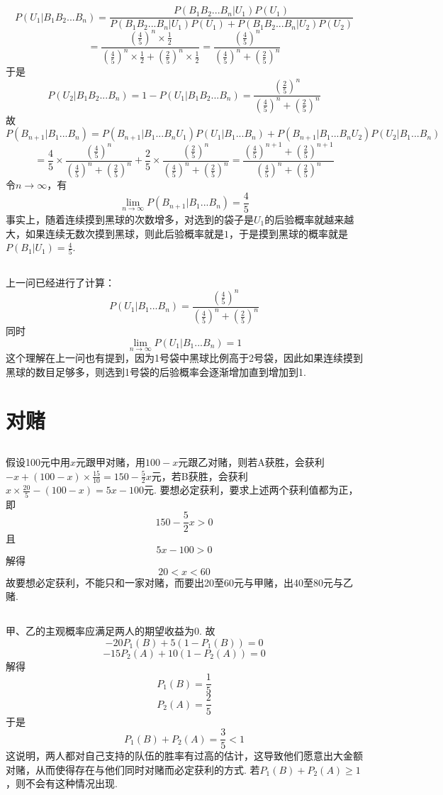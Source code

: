 \documentclass{article}
\begin{document}
\begin{CJK}{UTF8}{gbsn}
\subsection{}
$$P(U_{1}|B_{1}B_{2}...B_{n})=\frac{P(B_{1}B_{2}...B_{n}|U_{1})P(U_{1})}{P(B_{1}B_{2}...B_{n}|U_{1})P(U_{1})+P(B_{1}B_{2}...B_{n}|U_{2})P(U_{2})} $$
$$=\frac{(\frac{4}{5})^{n}\times \frac{1}{2}}{(\frac{4}{5})^{n}\times \frac{1}{2}+(\frac{2}{5})^{n}\times \frac{1}{2}}=\frac{(\frac{4}{5})^{n}}{(\frac{4}{5})^{n}+(\frac{2}{5})^{n}} $$
于是
$$P(U_{2}|B_{1}B_{2}...B_{n})=1-P(U_{1}|B_{1}B_{2}...B_{n})=\frac{(\frac{2}{5})^{n}}{(\frac{4}{5})^{n}+(\frac{2}{5})^{n}}$$
故
$$P(B_{n+1}|B_{1}...B_{n})=P(B_{n+1}|B_{1}...B_{n}U_{1})P(U_{1}|B_{1}...B_{n})+P(B_{n+1}|B_{1}...B_{n}U_{2})P(U_{2}|B_{1}...B_{n})$$
$$=\frac{4}{5}\times\frac{(\frac{4}{5})^{n}}{(\frac{4}{5})^{n}+(\frac{2}{5})^{n}}+\frac{2}{5}\times\frac{(\frac{2}{5})^{n}}{(\frac{4}{5})^{n}+(\frac{2}{5})^{n}}=\frac{(\frac{4}{5})^{n+1}+(\frac{2}{5})^{n+1}}{(\frac{4}{5})^{n}+(\frac{2}{5})^{n}}$$
令$n\to \infty$，有
$$\lim_{n\to \infty}P(B_{n+1}|B_{1}...B_{n})=\frac{4}{5}$$
事实上，随着连续摸到黑球的次数增多，对选到的袋子是$U_{1}$的后验概率就越来越大，如果连续无数次摸到黑球，则此后验概率就是$1$，于是摸到黑球的概率就是$P(B_{1}|U_{1})=\frac{4}{5}$.
\subsection{}
上一问已经进行了计算：
$$P(U_{1}|B_{1}...B_{n})=\frac{(\frac{4}{5})^{n}}{(\frac{4}{5})^{n}+(\frac{2}{5})^{n}}$$
同时
$$\lim_{n\to \infty}P(U_{1}|B_{1}...B_{n})=1$$
这个理解在上一问也有提到，因为1号袋中黑球比例高于2号袋，因此如果连续摸到黑球的数目足够多，则选到1号袋的后验概率会逐渐增加直到增加到1.
\section{对赌}
\subsection{}
假设100元中用$x$元跟甲对赌，用$100-x$元跟乙对赌，则若A获胜，会获利$-x+(100-x)\times\frac{15}{10}=150-\frac{5}{2}x$元，若B获胜，会获利$x\times\frac{20}{5}-(100-x)=5x-100$元.
要想必定获利，要求上述两个获利值都为正，即
$$150-\frac{5}{2}x>0$$
且
$$5x-100>0$$
解得
$$20<x<60$$
故要想必定获利，不能只和一家对赌，而要出20至60元与甲赌，出40至80元与乙赌.
\subsection{}
甲、乙的主观概率应满足两人的期望收益为0. 故
$$-20P_{1}(B)+5(1-P_{1}(B))=0$$
$$-15P_{2}(A)+10(1-P_{2}(A))=0$$
解得
$$P_{1}(B)=\frac{1}{5}$$
$$P_{2}(A)=\frac{2}{5}$$
于是
$$P_{1}(B)+P_{2}(A)=\frac{3}{5}<1$$
这说明，两人都对自己支持的队伍的胜率有过高的估计，这导致他们愿意出大金额对赌，从而使得存在与他们同时对赌而必定获利的方式. 若$P_{1}(B)+P_{2}(A)\geq 1$，则不会有这种情况出现.

\end{CJK}
\end{document}
